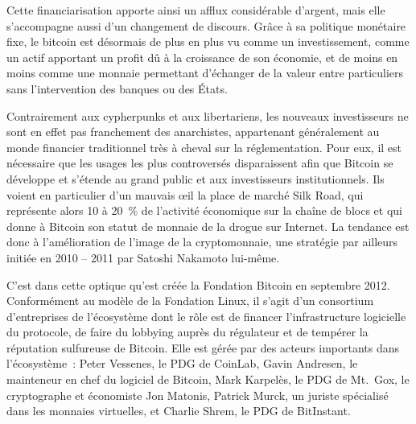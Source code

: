 Cette financiarisation apporte ainsi un afflux considérable d'argent, mais elle s'accompagne aussi d'un changement de discours. Grâce à sa politique monétaire fixe, le bitcoin est désormais de plus en plus vu comme un investissement, comme un actif apportant un profit dû à la croissance de son économie, et de moins en moins comme une monnaie permettant d'échanger de la valeur entre particuliers sans l'intervention des banques ou des États.

Contrairement aux cypherpunks et aux libertariens, les nouveaux investisseurs ne sont en effet pas franchement des anarchistes, appartenant généralement au monde financier traditionnel très à cheval sur la réglementation. Pour eux, il est nécessaire que les usages les plus controversés disparaissent afin que Bitcoin se développe et s'étende au grand public et aux investisseurs institutionnels. Ils voient en particulier d'un mauvais œil la place de marché Silk Road, qui représente alors 10 à 20~\% de l'activité économique sur la chaîne de blocs et qui donne à Bitcoin son statut de monnaie de la drogue sur Internet. La tendance est donc à l'amélioration de l'image de la cryptomonnaie, une stratégie par ailleurs initiée en 2010 -- 2011 par Satoshi Nakamoto lui-même.

C'est dans cette optique qu'est créée la Fondation Bitcoin en septembre 2012. Conformément au modèle de la Fondation Linux, il s'agit d'un consortium d'entreprises de l'écosystème dont le rôle est de financer l'infrastructure logicielle du protocole, de faire du lobbying auprès du régulateur et de tempérer la réputation sulfureuse de Bitcoin. Elle est gérée par des acteurs importants dans l'écosystème~: Peter Vessenes, le PDG de CoinLab, Gavin Andresen, le mainteneur en chef du logiciel de Bitcoin, Mark Karpelès, le PDG de Mt.~Gox, le cryptographe et économiste Jon Matonis, Patrick Murck, un juriste spécialisé dans les monnaies virtuelles, et Charlie Shrem, le PDG de BitInstant.

